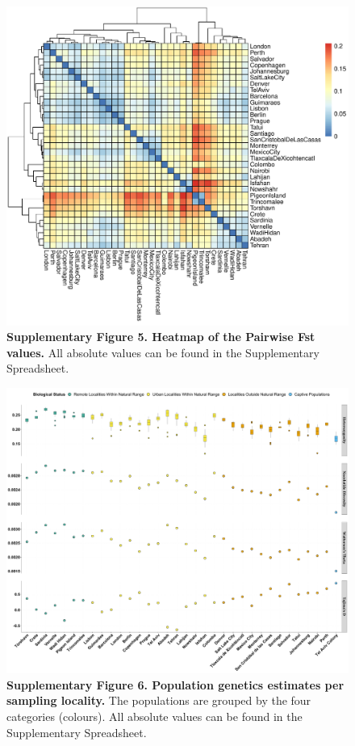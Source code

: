 \documentclass[twoside, british, a4paper]{article}
\begin{document}
\begin{figure}
\centering
\includegraphics[width=1\textwidth]{../FPG--Pipeline/FPG--Plots/FPG--Fst/FPG--Fst.pdf}
\captionsetup{labelformat=empty}
\caption[\textbf{Supplementary Figure 5. Heatmap of the Pairwise Fst values.}]{\textbf{Supplementary Figure 5. Heatmap of the Pairwise Fst values.} All absolute values can be found in the Supplementary Spreadsheet.}
\label{MainText:FPG--Fst}
\end{figure}

\begin{figure}
\centering
\includegraphics[width=1\textwidth]{../FPG--Pipeline/FPG--Plots/FPG--PopGenEstimates/FPG--PopGenEstimates.pdf}
\captionsetup{labelformat=empty}
\caption[\textbf{Supplementary Figure 6. Population genetics estimates per sampling locality.}]{\textbf{Supplementary Figure 6. Population genetics estimates per sampling locality.} The populations are grouped by the four categories (colours). All absolute values can be found in the Supplementary Spreadsheet.}
\label{MainText:FPG--PopGenEstimates}
\end{figure}
\end{document}
